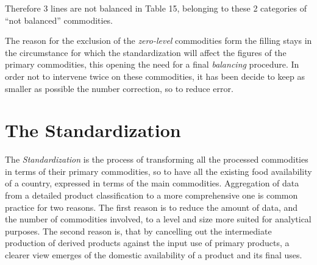\documentclass[]{article}
\begin{document}
Therefore 3 lines are not balanced in Table 15, belonging to these 2
categories of ``not balanced'' commodities.

The reason for the exclusion of the \emph{zero-level} commodities form
the filling stays in the circumstance for which the standardization will
affect the figures of the primary commodities, this opening the need for
a final \emph{balancing} procedure. In order not to intervene twice on
these commodities, it has been decide to keep as smaller as possible the
number correction, so to reduce error.

\section{The Standardization}\label{the-standardization}

The \emph{Standardization} is the process of transforming all the
processed commodities in terms of their primary commodities, so to have
all the existing food availability of a country, expressed in terms of
the main commodities. Aggregation of data from a detailed product
classification to a more comprehensive one is common practice for two
reasons. The first reason is to reduce the amount of data, and the
number of commodities involved, to a level and size more suited for
analytical purposes. The second reason is, that by cancelling out the
intermediate production of derived products against the input use of
primary products, a clearer view emerges of the domestic availability of
a product and its final uses.
\end{document}
